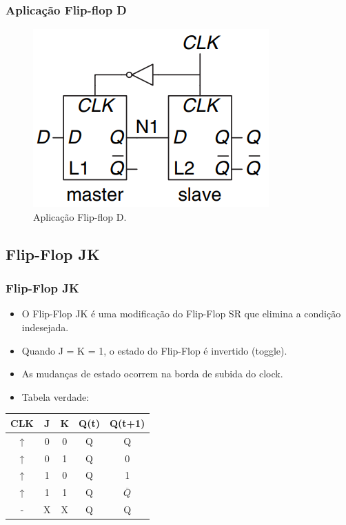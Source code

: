 \documentclass{beamer}
\begin{document}
 \begin{frame}
\frametitle{Aplicação Flip-flop D}
\begin{figure}
    \centering
    \includegraphics[width=0.6\columnwidth]{figures/flipflop_d_schematic.png}
    \caption{Aplicação Flip-flop D.}
\end{figure}
\end{frame}


\subsection{Flip-Flop JK}
\begin{frame}
\frametitle{Flip-Flop JK}
\begin{itemize}
    \item O Flip-Flop JK é uma modificação do Flip-Flop SR que elimina a condição indesejada.
    \item Quando J = K = 1, o estado do Flip-Flop é invertido (toggle).
    \item As mudanças de estado ocorrem na borda de subida do clock.
    \item Tabela verdade:
\end{itemize}

\begin{table}[]
\centering
\begin{tabular}{|c|c|c|c|c|}
\hline
CLK & J & K & Q(t) & Q(t+1) \\
\hline
↑   & 0 & 0 & Q     & Q \\
↑   & 0 & 1 & Q     & 0 \\
↑   & 1 & 0 & Q     & 1 \\
↑   & 1 & 1 & Q     & $\overline{Q}$ \\
\hline
-   & X & X & Q     & Q \\
\hline
\end{tabular}
\end{table}
\end{frame}
\end{document}
